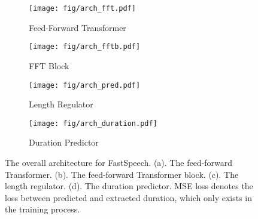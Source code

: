 \documentclass{article}
\begin{document}
\begin{figure*}[!t] 
	\centering
	\begin{subfigure}[h]{0.30\textwidth}
		\centering
		\texttt{[image: fig/arch\_fft.pdf]}	
		\vspace{-0.38cm}
		\caption{Feed-Forward Transformer}
		\label{fig_arch1}
	\end{subfigure}
	\begin{subfigure}[h]{0.20\textwidth}
		\centering
		\vspace{0.4cm}
		\texttt{[image: fig/arch\_fftb.pdf]}
		\vspace{0.2cm}
		\caption{FFT Block}
		\label{fig_arch2}
	\end{subfigure}
	\begin{subfigure}[h]{0.20\textwidth}
		\centering
		\vspace{0.4cm}
		\texttt{[image: fig/arch\_pred.pdf]}
		\vspace{0.2cm}
		\caption{Length Regulator}
		\label{fig_arch3}
	\end{subfigure}
	\begin{subfigure}[h]{0.28\textwidth}
		\centering
		\vspace{0.4cm}
		\texttt{[image: fig/arch\_duration.pdf]}
		\vspace{0.1cm}
		\caption{Duration Predictor}
		\label{fig_arch4}
	\end{subfigure}
	\caption{The overall architecture for FastSpeech. (a). The feed-forward Transformer. (b). The feed-forward Transformer block. (c). The length regulator. (d). The duration predictor. MSE loss denotes the loss between predicted and extracted duration, which only exists in the training process.}
	\vspace{-0.2cm}
	\label{fig_archi}
\end{figure*}
\end{document}
